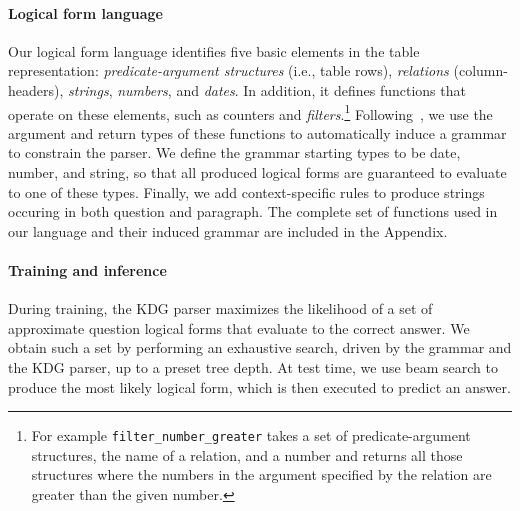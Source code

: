 \paragraph{Logical form language}
Our logical form language identifies five basic elements in the table representation: \textit{predicate-argument structures} (i.e., table rows), \textit{relations} (column-headers), \textit{strings}, \textit{numbers}, and \textit{dates}. 
In addition, it defines functions that operate on these elements,
such as counters and \emph{filters}.\footnote{For example \texttt{filter\_number\_greater} takes a set of predicate-argument structures, the name of a relation, and a number and returns all those structures where the numbers in the argument specified by the relation are greater than the given number.} 
Following~\citet{Krishnamurthy2017neuralsp}, we use the argument and return types of these functions to automatically induce a grammar to constrain the parser. We define the grammar starting types to be date, number, and string, so that all produced logical forms are guaranteed to evaluate to one of these types. Finally, we add context-specific rules to produce strings occuring in both question and paragraph. 
The complete set of functions used in our language and their induced grammar are included in the Appendix. 

\paragraph{Training and inference}
During training, the KDG parser maximizes the likelihood of a set of approximate question logical forms that evaluate to the correct answer. We obtain such a set by performing an exhaustive search, driven by the grammar and the KDG parser, up to a preset tree depth. At test time, we use beam search to produce the most likely logical form, which is then executed to predict an answer.

